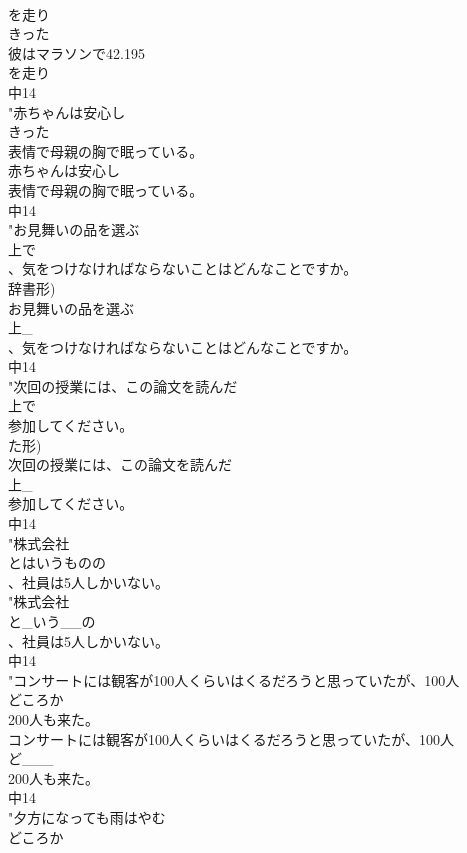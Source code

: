 \documentclass[8pt]{extreport}
\begin{document}
\begin{CJK}{UTF8}{min}
\\	を走り
\\	きった
\\	彼はマラソンで42.195
\\	を走り
\\	中14
\\	"赤ちゃんは安心し
\\	きった
\\	表情で母親の胸で眠っている。
\\	赤ちゃんは安心し
\\	表情で母親の胸で眠っている。
\\	中14
\\	"お見舞いの品を選ぶ
\\	上で
\\	、気をつけなければならないことはどんなことですか。
\\	辞書形)	
\\	お見舞いの品を選ぶ
\\	上_
\\	、気をつけなければならないことはどんなことですか。
\\	中14
\\	"次回の授業には、この論文を読んだ
\\	上で
\\	参加してください。
\\	た形)	
\\	次回の授業には、この論文を読んだ
\\	上_
\\	参加してください。
\\	中14
\\	"株式会社
\\	とはいうものの
\\	、社員は5人しかいない。
\\	"株式会社
\\	と_いう__の
\\	、社員は5人しかいない。
\\	中14
\\	"コンサートには観客が100人くらいはくるだろうと思っていたが、100人
\\	どころか
\\	200人も来た。
\\	コンサートには観客が100人くらいはくるだろうと思っていたが、100人
\\	ど___
\\	200人も来た。
\\	中14
\\	"夕方になっても雨はやむ
\\	どころか

\end{CJK}
\end{document}
